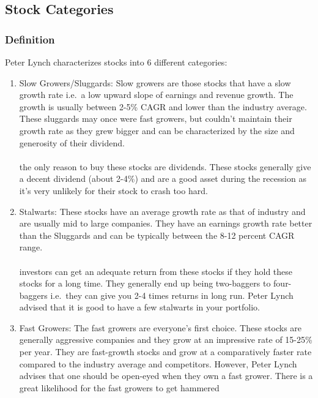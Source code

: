 \subsection{Stock Categories}

\subsubsection{Definition}

Peter Lynch characterizes stocks into 6 different categories:
\begin{enumerate}
    \item Slow Growers/Sluggards: Slow growers are those stocks that have a slow 
        growth rate i.e.\ a low upward slope of earnings and revenue growth. The 
        growth is usually between 2-5\% CAGR and lower than the industry average. 
        These sluggards may once were fast growers, but couldn’t maintain their 
        growth rate as they grew bigger and can be characterized by the size and 
        generosity of their dividend.\\\\
        the only reason to buy these stocks are dividends. These stocks generally 
        give a decent dividend (about 2-4\%) and are a good asset during the 
        recession as it’s very unlikely for their stock to crash too hard.
    \item Stalwarts: These stocks have an average growth rate as that of industry 
        and are usually mid to large companies. They have an earnings growth 
        rate better than the Sluggards and can be typically between the 8-12 percent 
        CAGR range.\\\\
        investors can get an adequate return from these stocks if they hold 
        these stocks for a long time. They generally end up being two-baggers to 
        four-baggers i.e.\ they can give you 2-4 times returns in long run. Peter 
        Lynch advised that it is good to have a few stalwarts in your portfolio.
    \item Fast Growers: The fast growers are everyone’s first choice. These stocks 
        are generally aggressive companies and they grow at an impressive rate of 
        15-25\% per year. They are fast-growth stocks and grow at a comparatively 
        faster rate compared to the industry average and competitors. However, 
        Peter Lynch advises that one should be open-eyed when they own a fast 
        grower. There is a great likelihood for the fast growers to get hammered 

\end{enumerate}
